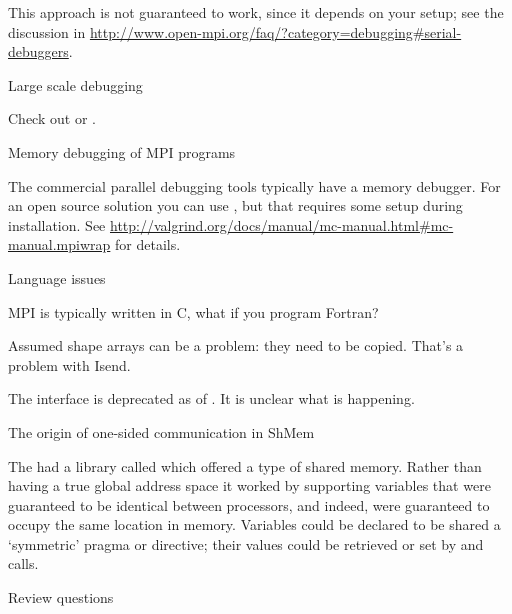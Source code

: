 This approach is not guaranteed to work, since it depends on
your  setup; see the discussion
in \url{http://www.open-mpi.org/faq/?category=debugging#serial-debuggers}.

 {Large scale debugging}

Check out  or .

 {Memory debugging of MPI programs}

The commercial parallel debugging tools typically have a memory
debugger. For an open source solution you can
use , but that requires some setup during
installation. See \url{http://valgrind.org/docs/manual/mc-manual.html#mc-manual.mpiwrap}
for details.

 {Language issues}

MPI is typically written in C, what if you program Fortran?

Assumed shape arrays can be a problem: they need to be copied. 
That's a problem with Isend.

The  interface is deprecated as of .
It is unclear what is happening.

 {The origin of one-sided communication in ShMem}

The  had a library called 
which offered a type of shared memory. Rather than having a true
global address space it worked by supporting variables that were
guaranteed to be identical between processors, and indeed, were
guaranteed to occupy the same location in memory. Variables could be
declared to be shared a `symmetric' pragma or directive; their values
could be retrieved or set by  and  calls.

 {Review questions}

